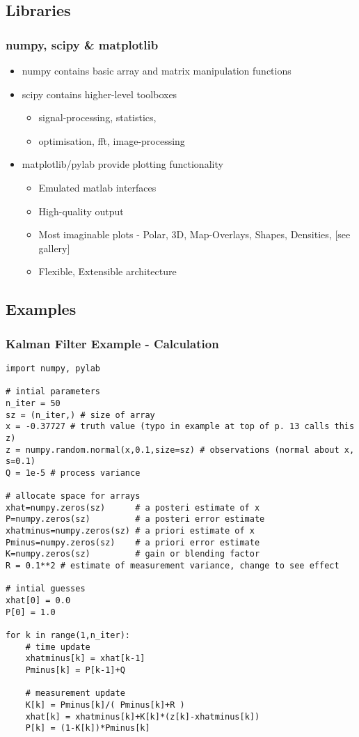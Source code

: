 \documentclass{beamer}
\begin{document}
\subsection{Libraries}
\frame
{
  \frametitle{numpy, scipy \& matplotlib}

  \begin{itemize}
  \item<1-> numpy contains basic array and matrix manipulation functions
  \item<2-> scipy contains higher-level toolboxes
	\begin{itemize}
  	\item<2-> signal-processing, statistics,
  	\item<2-> optimisation, fft, image-processing
	\end{itemize}
  \item<3-> matplotlib/pylab provide plotting functionality
	\begin{itemize}
  	\item<3-> Emulated matlab interfaces
  	\item<3-> High-quality output
  	\item<3-> Most imaginable plots - Polar, 3D, Map-Overlays, Shapes, Densities, [see gallery]
  	\item<3-> Flexible, Extensible architecture
	\end{itemize}

  \end{itemize}
}




\subsection{Examples}
\begin{frame}[fragile]
\tiny
\frametitle{Kalman Filter Example - Calculation}
\begin{lstlisting}
import numpy, pylab

# intial parameters
n_iter = 50
sz = (n_iter,) # size of array
x = -0.37727 # truth value (typo in example at top of p. 13 calls this z)
z = numpy.random.normal(x,0.1,size=sz) # observations (normal about x, s=0.1)
Q = 1e-5 # process variance

# allocate space for arrays
xhat=numpy.zeros(sz)      # a posteri estimate of x
P=numpy.zeros(sz)         # a posteri error estimate
xhatminus=numpy.zeros(sz) # a priori estimate of x
Pminus=numpy.zeros(sz)    # a priori error estimate
K=numpy.zeros(sz)         # gain or blending factor
R = 0.1**2 # estimate of measurement variance, change to see effect

# intial guesses
xhat[0] = 0.0
P[0] = 1.0

for k in range(1,n_iter):
    # time update
    xhatminus[k] = xhat[k-1]
    Pminus[k] = P[k-1]+Q

    # measurement update
    K[k] = Pminus[k]/( Pminus[k]+R )
    xhat[k] = xhatminus[k]+K[k]*(z[k]-xhatminus[k])
    P[k] = (1-K[k])*Pminus[k]

\end{lstlisting}
\end{frame}
\end{document}
